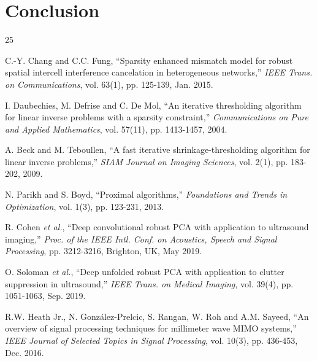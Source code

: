 \documentclass[a4paper, 12pt, onecolumn, journal, twoside, draftclsnofoot]{IEEEtran}
\begin{document}

\section{Conclusion}		\label{sec_concl}


\begin{thebibliography}{25}


C.-Y. Chang and C.C. Fung, ``Sparsity enhanced mismatch model for robust spatial intercell interference cancelation in heterogeneous networks,'' \emph{IEEE Trans. on Communications}, vol. 63(1), pp. 125-139, Jan. 2015.

I. Daubechies, M. Defrise and C. De Mol, ``An iterative thresholding algorithm for linear inverse problems with a sparsity constraint,'' \emph{Communications on Pure and Applied Mathematics}, vol. 57(11), pp. 1413-1457, 2004.

A. Beck and M. Teboullen, ``A fast iterative shrinkage-thresholding algorithm for linear inverse problems,'' \emph{SIAM Journal on Imaging Sciences}, vol. 2(1), pp. 183-202, 2009.

N. Parikh and S. Boyd, ``Proximal algorithms,'' \emph{Foundations and Trends in  Optimization}, vol. 1(3), pp. 123-231, 2013.

R. Cohen \emph{et al.}, ``Deep convolutional robust PCA with application to ultrasound imaging,'' \emph{Proc. of the IEEE Intl. Conf. on Acoustics, Speech and Signal Processing}, pp. 3212-3216, Brighton, UK, May 2019.

O. Soloman \emph{et al.}, ``Deep unfolded robust PCA with application to clutter suppression in ultrasound,'' \emph{IEEE Trans. on Medical Imaging}, vol. 39(4), pp. 1051-1063, Sep. 2019.

R.W. Heath Jr., N. Gonz\'alez-Prelcic, S. Rangan, W. Roh and A.M. Sayeed, ``An overview of signal processing techniques for millimeter wave MIMO systems,'' \emph{IEEE Journal of Selected Topics in Signal Processing}, vol. 10(3), pp. 436-453, Dec. 2016.




\end{thebibliography}
\end{document}
